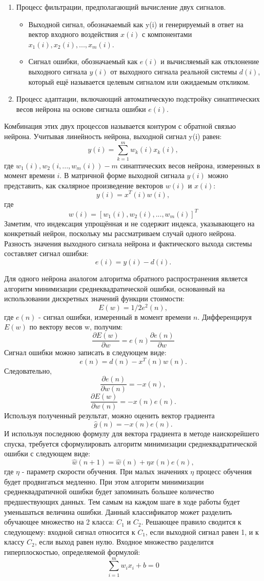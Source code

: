 \documentclass[oneside,final,14pt]{extreport}
\begin{document}
\begin{enumerate}
    \item Процесс фильтрации, предполагающий вычисление двух сигналов.
    \begin{itemize}
        \item Выходной сигнал, обозначаемый как y(i) и генерируемый в ответ на вектор входного воздействия \(x(i)\) с компонентами \(x_1(i),x_2(i),...,x_m(i)\).
        \item Сигнал ошибки, обозначаемый как \(e(i)\) и вычисляемый как отклонение выходного сигнала \(y(i)\) от выходного сигнала реальной системы \(d(i)\), который ещё называется целевым сигналом или ожидаемым откликом.
    \end{itemize}
    \item Процесс адаптации, включающий автоматическую подстройку синаптических весов нейрона на основе сигнала ошибки \(e(i)\).
\end{enumerate}
Комбинация этих двух процессов называется контуром с обратной связью нейрона. 
Учитывая линейность нейрона, выходной сигнал y(i) равен:
\[y(i) = \sum_{k=1}^m w_k(i)x_k(i),\]
где \(w_1(i),w_2(i,...,w_m(i)) - m \) синаптических весов нейрона, измеренных в момент времени \(i\). В матричной форме выходной сигнала \(y(i)\) можно представить, как скалярное произведение векторов \(w(i)\) и \(x(i)\):
\[y(i) = x^T(i)w(i),\] где \[w(i) = [w_1(i), w_2(i),...,w_m(i)]^T\]
Заметим, что индексация упрощённая и не содержит индекса, указывающего на конкретный нейрон, поскольку мы рассматриваем случай одного нейрона. Разность значения выходного сигнала нейрона и фактического выхода системы составляет сигнал ошибки:
\[e(i) = y(i) - d(i).\]

Для одного нейрона аналогом алгоритма обратного распространения является алгоритм минимизации среднеквадратической ошибки, основанный на использовании дискретных значений функции стоимости:
\[E(w) = 1/2e^2(n),\]
где \(e(n)\) - сигнал ошибки, измеренный в момент времени \(n\). Дифференцируя \(E(w)\) по вектору весов w, получим:
\[ \frac{\partial E(w)}{\partial w} = e(n) \frac{\partial e(n)}{\partial w } \]
Сигнал ошибки можно записать в следующем виде:
\[e(n) = d(n) - x^T(n)w(n).\]
Следовательно,
\[\frac{\partial e(n)}{\partial w(n)} = -x(n),\]
\[\frac{\partial E(w)}{\partial w(n)} = -x(n)e(n).\]
Используя полученный результат, можно оценить вектор градиента
\[ \hat g(n) = -x(n)e(n).\]
И используя последнюю формулу для вектора градиента в методе наискорейшего спуска, требуется сформулировать алгоритм минимизации среднеквадратической ошибки с следующем виде:
\[\hat w(n+1) = \hat w(n) +\eta x(n)e(n),\]
где \(\eta \) - параметр скорости обучения. 
При малых значениях \(\eta \) процесс обучения будет продвигаться медленно. При этом алгоритм минимизации среднеквадратичной ошибки будет запоминать большее количество предшествующих данных.
Тем самым на каждом шаге в ходе работы будет уменьшаться величина ошибки.
Данный классификатор может разделить обучающее множество на 2 класса: \(C_1\) и \(C_2\). Решающее правило сводится к следующему: входной сигнал относится к \(C_1\), если выходной сигнал равен 1, и к классу \(C_2\), если выход равен нулю. Входное множество разделится гиперплоскостью, определяемой формулой:
\[ \sum_{i=1}^m w_i x_i+b = 0 \]
\end{document}
